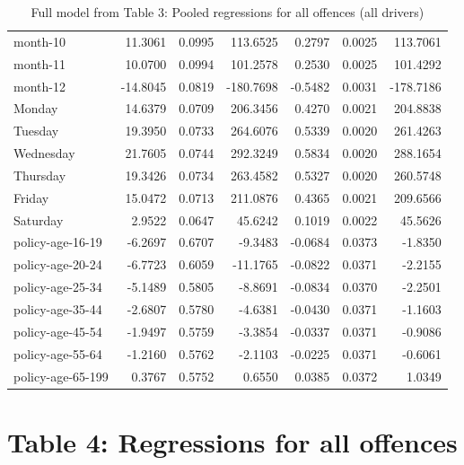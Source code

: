 \documentclass[10pt]{article}
\begin{document}
\begin{table}[ht]
\begin{tabular}{lrrrrrr}
  month-10 & 11.3061 & 0.0995 & 113.6525 & 0.2797 & 0.0025 & 113.7061 \\ 
  month-11 & 10.0700 & 0.0994 & 101.2578 & 0.2530 & 0.0025 & 101.4292 \\ 
  month-12 & -14.8045 & 0.0819 & -180.7698 & -0.5482 & 0.0031 & -178.7186 \\ 
  Monday & 14.6379 & 0.0709 & 206.3456 & 0.4270 & 0.0021 & 204.8838 \\ 
  Tuesday & 19.3950 & 0.0733 & 264.6076 & 0.5339 & 0.0020 & 261.4263 \\ 
  Wednesday & 21.7605 & 0.0744 & 292.3249 & 0.5834 & 0.0020 & 288.1654 \\ 
  Thursday & 19.3426 & 0.0734 & 263.4582 & 0.5327 & 0.0020 & 260.5748 \\ 
  Friday & 15.0472 & 0.0713 & 211.0876 & 0.4365 & 0.0021 & 209.6566 \\ 
  Saturday & 2.9522 & 0.0647 & 45.6242 & 0.1019 & 0.0022 & 45.5626 \\ 
  policy-age-16-19 & -6.2697 & 0.6707 & -9.3483 & -0.0684 & 0.0373 & -1.8350 \\ 
  policy-age-20-24 & -6.7723 & 0.6059 & -11.1765 & -0.0822 & 0.0371 & -2.2155 \\ 
  policy-age-25-34 & -5.1489 & 0.5805 & -8.8691 & -0.0834 & 0.0370 & -2.2501 \\ 
  policy-age-35-44 & -2.6807 & 0.5780 & -4.6381 & -0.0430 & 0.0371 & -1.1603 \\ 
  policy-age-45-54 & -1.9497 & 0.5759 & -3.3854 & -0.0337 & 0.0371 & -0.9086 \\ 
  policy-age-55-64 & -1.2160 & 0.5762 & -2.1103 & -0.0225 & 0.0371 & -0.6061 \\ 
  policy-age-65-199 & 0.3767 & 0.5752 & 0.6550 & 0.0385 & 0.0372 & 1.0349 \\ 
   \hline
\end{tabular}
\caption{Full model from Table 3: Pooled regressions for all offences (all drivers)} 
\label{tab_3_all_pts_with_age_A}
\end{table}


\clearpage
\pagebreak




\section{Table 4: Regressions for all offences}
\end{document}
